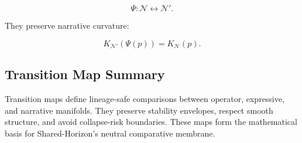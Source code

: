 \[
\Psi : \mathcal{N} \leftrightarrow \mathcal{N}'.
\]

They preserve narrative curvature:

\[
K_{\mathcal{N}'}(\Psi(p)) = K_{\mathcal{N}}(p).
\]

\subsection{Transition Map Summary}

Transition maps define lineage-safe comparisons between operator, expressive,
and narrative manifolds. They preserve stability envelopes, respect smooth
structure, and avoid collapse-risk boundaries. These maps form the mathematical
basis for Shared-Horizon’s neutral comparative membrane.
